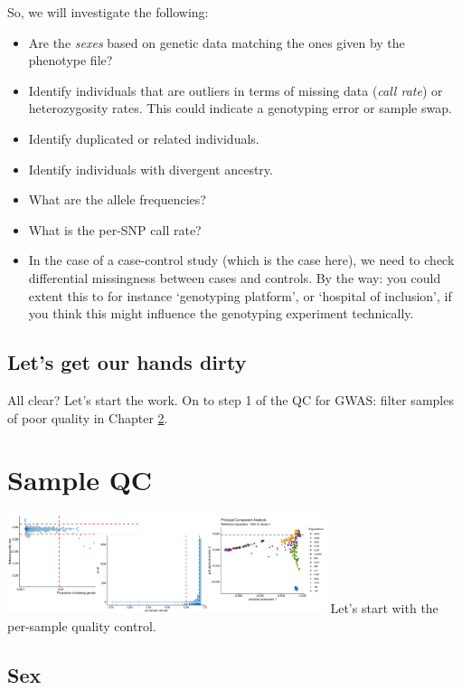 \documentclass[
]{book}
\providecommand{\tightlist}{%
  \setlength{\itemsep}{0pt}\setlength{\parskip}{0pt}}
\begin{document}
So, we will investigate the following:

\begin{itemize}
\tightlist
\item
  Are the \emph{sexes} based on genetic data matching the ones given by the phenotype file?
\item
  Identify individuals that are outliers in terms of missing data (\emph{call rate}) or heterozygosity rates. This could indicate a genotyping error or sample swap.
\item
  Identify duplicated or related individuals.
\item
  Identify individuals with divergent ancestry.
\item
  What are the allele frequencies?
\item
  What is the per-SNP call rate?
\item
  In the case of a case-control study (which is the case here), we need to check differential missingness between cases and controls. By the way: you could extent this to for instance `genotyping platform', or `hospital of inclusion', if you think this might influence the genotyping experiment technically.
\end{itemize}

\hypertarget{lets-get-our-hands-dirty}{%
\section{Let's get our hands dirty}\label{lets-get-our-hands-dirty}}

All clear? Let's start the work. On to step 1 of the QC for GWAS: filter samples of poor quality in Chapter \ref{gwas-basics-sample-qc}.

\hypertarget{gwas-basics-sample-qc}{%
\chapter{Sample QC}\label{gwas-basics-sample-qc}}

\includegraphics[width=0.7\textwidth,height=\textheight]{img/gwas_sample_qc.png}
Let's start with the per-sample quality control.

\hypertarget{sex}{%
\section{Sex}\label{sex}}
\end{document}
